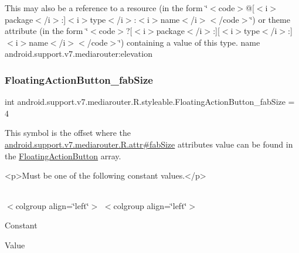 This may also be a reference to a resource (in the form \char`\"{}$<$code$>$@\mbox{[}$<$i$>$package$<$/i$>$\+:\mbox{]}$<$i$>$type$<$/i$>$\+:$<$i$>$name$<$/i$>$$<$/code$>$\char`\"{}) or theme attribute (in the form \char`\"{}$<$code$>$?\mbox{[}$<$i$>$package$<$/i$>$\+:\mbox{]}\mbox{[}$<$i$>$type$<$/i$>$\+:\mbox{]}$<$i$>$name$<$/i$>$$<$/code$>$\char`\"{}) containing a value of this type.  name android.\+support.\+v7.\+mediarouter\+:elevation \mbox{\label{classandroid_1_1support_1_1v7_1_1mediarouter_1_1R_1_1styleable_abfd62dce09171db92b5473f46d12f11c}} 
\subsubsection{\texorpdfstring{Floating\+Action\+Button\+\_\+fab\+Size}{FloatingActionButton\_fabSize}}
{\footnotesize\ttfamily int android.\+support.\+v7.\+mediarouter.\+R.\+styleable.\+Floating\+Action\+Button\+\_\+fab\+Size = 4\hspace{0.3cm}{\ttfamily [static]}}

This symbol is the offset where the \hyperlink{classandroid_1_1support_1_1v7_1_1mediarouter_1_1R_1_1attr_a0ede172ed4b9ba8bf23af12e26f093fe}{android.\+support.\+v7.\+mediarouter.\+R.\+attr\#fab\+Size} attribute\textquotesingle{}s value can be found in the \hyperlink{classandroid_1_1support_1_1v7_1_1mediarouter_1_1R_1_1styleable_ae665bad1758a0b708ec034929b76af91}{Floating\+Action\+Button} array.

\begin{DoxyVerb}      <p>Must be one of the following constant values.</p>
\end{DoxyVerb}
 \tabulinesep=1mm
\begin{longtabu} spread 0pt [c]{*{0}{|X[-1]}|}
\hline
\end{longtabu}
$<$colgroup align=\char`\"{}left\char`\"{}$>$ $<$colgroup align=\char`\"{}left\char`\"{}$>$ 

Constant

Value


